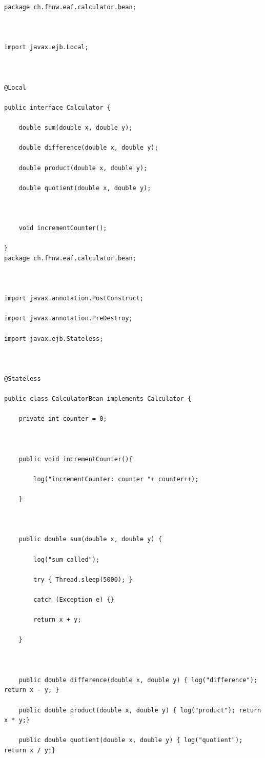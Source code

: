 \documentclass[a4paper,10pt]{scrreprt}
\begin{document}
\begin{lstlisting}[caption=Stateless Bean]
 package ch.fhnw.eaf.calculator.bean;



import javax.ejb.Local;



@Local

public interface Calculator {

	double sum(double x, double y);

	double difference(double x, double y);

	double product(double x, double y);

	double quotient(double x, double y);



	void incrementCounter();

}
package ch.fhnw.eaf.calculator.bean;



import javax.annotation.PostConstruct;

import javax.annotation.PreDestroy;

import javax.ejb.Stateless;



@Stateless

public class CalculatorBean implements Calculator {

	private int counter = 0;

	

	public void incrementCounter(){

		log("incrementCounter: counter "+ counter++);

	}



	public double sum(double x, double y) {

		log("sum called");

		try { Thread.sleep(5000); }

		catch (Exception e) {}

		return x + y;

	}



   	public double difference(double x, double y) { log("difference"); return x - y; }

	public double product(double x, double y) {	log("product"); return x * y;}

	public double quotient(double x, double y) { log("quotient"); return x / y;}






\end{lstlisting}
\end{document}
